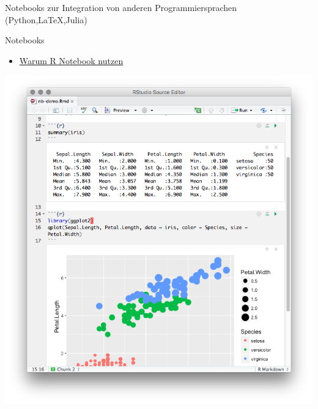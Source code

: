 \documentclass[ignorenonframetext,]{beamer}
\providecommand{\tightlist}{%
\setlength{\itemsep}{0pt}\setlength{\parskip}{0pt}}
\begin{document}
\begin{frame}{Notebooks zur Integration von anderen Programmiersprachen
(Python,LaTeX,Julia)}

\begin{block}{Notebooks}

\begin{itemize}
\tightlist
\item
  \href{https://news.ycombinator.com/item?id=12683625}{Warum R Notebook
  nutzen}
\end{itemize}

\includegraphics{./tex2pdf.9796/0b0d6667ad450fca127b308a6948cf371e84d658.png}

\end{block}

\end{frame}
\end{document}
